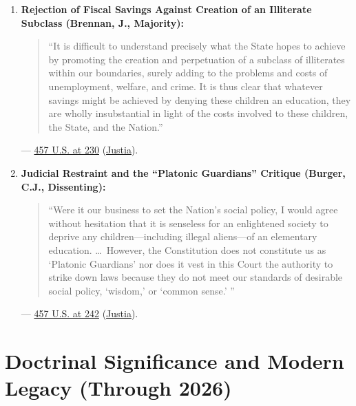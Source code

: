 \documentclass[12pt]{article}
\begin{document}
\begin{enumerate}
    \item \textbf{Rejection of Fiscal Savings Against Creation of an Illiterate Subclass (Brennan, J., Majority):}
    \begin{quote}
        ``It is difficult to understand precisely what the State hopes to achieve by promoting the creation and perpetuation of a subclass of illiterates within our boundaries, surely adding to the problems and costs of unemployment, welfare, and crime. It is thus clear that whatever savings might be achieved by denying these children an education, they are wholly insubstantial in light of the costs involved to these children, the State, and the Nation.''
    \end{quote}
    --- \href{https://www.law.cornell.edu/supremecourt/text/457/202}{457 U.S. at 230} (\href{https://supreme.justia.com/cases/federal/us/457/202/}{Justia}).

    \item \textbf{Judicial Restraint and the ``Platonic Guardians'' Critique (Burger, C.J., Dissenting):}
    \begin{quote}
        ``Were it our business to set the Nation's social policy, I would agree without hesitation that it is senseless for an enlightened society to deprive any children---including illegal aliens---of an elementary education. \ldots\ However, the Constitution does not constitute us as `Platonic Guardians' nor does it vest in this Court the authority to strike down laws because they do not meet our standards of desirable social policy, `wisdom,' or `common sense.' ''
    \end{quote}
    --- \href{https://www.law.cornell.edu/supremecourt/text/457/202}{457 U.S. at 242} (\href{https://supreme.justia.com/cases/federal/us/457/202/}{Justia}).
\end{enumerate}

\section{Doctrinal Significance and Modern Legacy (Through 2026)}
\end{document}
